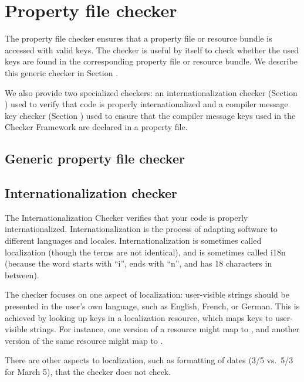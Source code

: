 \htmlhr
\chapter{Property file checker\label{propkey-checker}}

The property file checker ensures that a property file or resource bundle is
accessed with valid keys.
The checker is useful by itself to check whether the used keys are found in the
corresponding property file or resource bundle. We describe this generic checker
in Section .

We also provide two specialized checkers:
an internationalization checker (Section ) used to
verify that code is properly internationalized and
a compiler message key checker (Section ) used
to ensure that the compiler message keys used in the Checker Framework are
declared in a property file.


\section{Generic property file checker\label{genpropkey-checker}}






\section{Internationalization checker\label{i18n-checker}}

The Internationalization Checker verifies that your code is properly
internationalized.  Internationalization is the process of adapting
software to different languages and locales.  Internationalization is
sometimes called localization (though the terms are not identical), and is
sometimes called i18n (because the word starts with ``i'', ends with ``n'',
and has 18 characters in between).

The checker focuses on one aspect of localization:  user-visible strings
should be presented in the user's own language, such as English, French, or
German.  This is achieved by looking up keys in a localization resource,
which maps keys to user-visible strings.  For instance, one version of a
resource might map  to
, and another version of the same resource might map
 to .

There are other aspects to localization, such as formatting of dates (3/5
vs.~5/3 for March 5), that the checker does not check.

